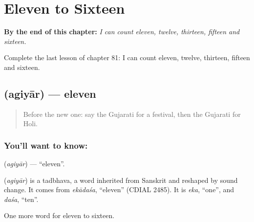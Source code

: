 
\chapter{Eleven to Sixteen}
\label{ch:gu-eleven-to-sixteen}

\begin{chapteropening}
\textbf{By the end of this chapter:} \emph{I can count eleven, twelve, thirteen, fifteen and sixteen.}

Complete the last lesson of chapter 81: I can count eleven, twelve, thirteen, fifteen and sixteen.
\end{chapteropening}

\section[\texorpdfstring{\gu{અગિયાર} (agiyār)}{અગિયાર (agiyār)}]{ (agiyār) — eleven}

\label{lesson:GU-C81-eleven}



\begin{quote}
Before the new one: say the Gujarati for a festival, then the Gujarati for Holi.
\end{quote}

\subsection*{You'll want to know: }
\textbf{} (\emph{agiyār}) — \textquotedblleft{}eleven\textquotedblright{}.

\begin{cousinweb}
\textbf{} (\emph{agiyār}) is a tadbhava, a word inherited from Sanskrit and reshaped by sound change. It comes from \emph{ekādaśa}, \textquotedblleft{}eleven\textquotedblright{} (CDIAL 2485). It is \emph{eka}, \textquotedblleft{}one\textquotedblright{}, and \emph{daśa}, \textquotedblleft{}ten\textquotedblright{}.
\end{cousinweb}

\begin{grammarlens}[title={What you've built}]
One more word for eleven to sixteen.
\end{grammarlens}

